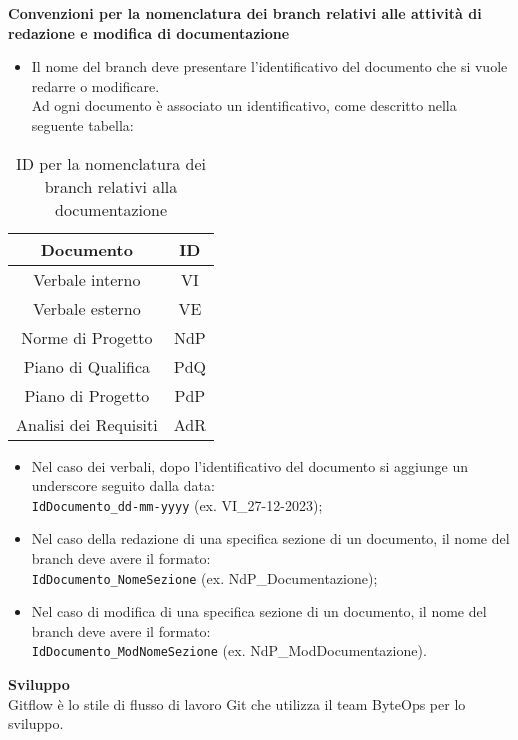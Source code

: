 \textbf{Convenzioni per la nomenclatura dei branch relativi alle attività di redazione e modifica di documentazione} \\

\begin{itemize}
    \item Il nome del branch deve presentare l'identificativo del documento che si vuole redarre o modificare. \\
    Ad ogni documento è associato un identificativo, come descritto nella seguente tabella:
\end{itemize}

\begin{table}[H]
    \centering
    \begin{tabular}{|c|c|}
        \hline
        Documento & ID \\
        \hline
        Verbale interno & VI \\
        Verbale esterno & VE \\
        Norme di Progetto & NdP \\
        Piano di Qualifica & PdQ \\
        Piano di Progetto & PdP \\ 
        Analisi dei Requisiti & AdR \\
        \hline
    \end{tabular}
    \caption{ID per la nomenclatura dei branch relativi alla documentazione}
\end{table}

\begin{itemize}
    \item Nel caso dei verbali, dopo l'identificativo del documento si aggiunge un underscore seguito dalla data: \\
    \texttt{IdDocumento\_dd-mm-yyyy} (ex. VI\_27-12-2023);
    \item Nel caso della redazione di una specifica sezione di un documento, il nome del branch deve avere il formato: \\
    \texttt{IdDocumento\_NomeSezione} (ex. NdP\_Documentazione);
    \item Nel caso di modifica di una specifica sezione di un documento, il nome del branch deve avere il formato: \\
    \texttt{IdDocumento\_ModNomeSezione} (ex. NdP\_ModDocumentazione).
\end{itemize}

\textbf{Sviluppo} \\
Gitflow è lo stile di flusso di lavoro Git che utilizza il team ByteOps per lo sviluppo.

